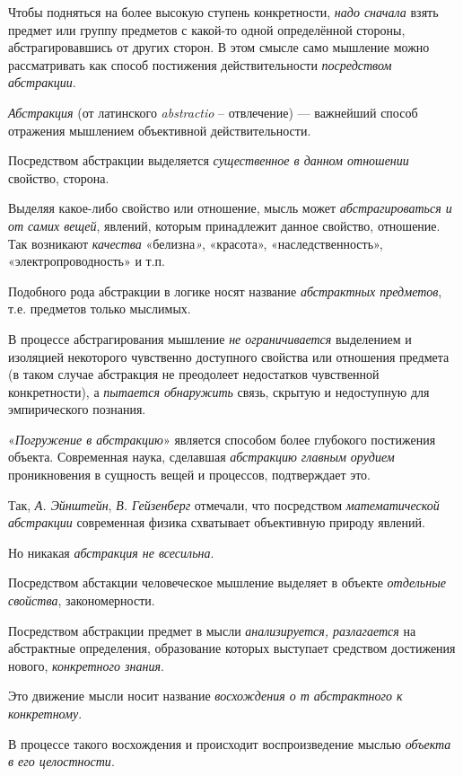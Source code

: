 \documentclass[a4paper,14pt,russian]{extreport}
\begin{document}
Чтобы подняться на более высокую ступень конкретности, \emph{надо сначала} взять предмет или группу предметов с какой-то одной определённой стороны, абстрагировавшись от других сторон. В этом смысле само мышление можно рассматривать как способ постижения действительности \emph{посредством абстракции}.

\emph{Абстракция} (от латинского \emph{abstractio} -- отвлечение) --- важнейший способ отражения мышлением объективной действительности.

Посредством абстракции выделяется \emph{существенное в данном отношении} свойство, сторона.

Выделяя какое-либо свойство или отношение, мысль может \emph{абстрагироваться и от самих вещей}, явлений, которым принадлежит данное свойство, отношение. Так возникают \emph{качества} «белизна\emph{»}, «красота», «наследственность», «электропроводность» и т.п.

Подобного рода абстракции в логике носят название \emph{абстрактных предметов}, т.е. предметов только мыслимых.

В процессе абстрагирования мышление \emph{не ограничивается} выделением и изоляцией некоторого чувственно доступного свойства или отношения предмета (в таком случае абстракция не преодолеет недостатков чувственной конкретности), а \emph{пытается обнаружить} связь, скрытую и недоступную для эмпирического познания.

«\emph{Погружение в абстракцию}» является способом более глубокого постижения объекта. Современная наука, сделавшая \emph{абстракцию главным орудием} проникновения в сущность вещей и процессов, подтверждает это.

Так, \emph{А. Эйнштейн}, \emph{В. Гейзенберг} отмечали, что посредством \emph{математической абстракции} современная физика схватывает объективную природу явлений.

Но никакая \emph{абстракция не всесильна}.

Посредством абстакции человеческое мышление выделяет в объекте \emph{отдельные свойства}, закономерности.

Посредством абстракции предмет в мысли \emph{анализируется, разлагается} на абстрактные определения, образование которых выступает средством достижения нового, \emph{конкретного знания}.

Это движение мысли носит название \emph{восхождения о т абстрактного к конкретному}.

В процессе такого восхождения и происходит воспроизведение мыслью \emph{объекта в его целостности}.
\end{document}

